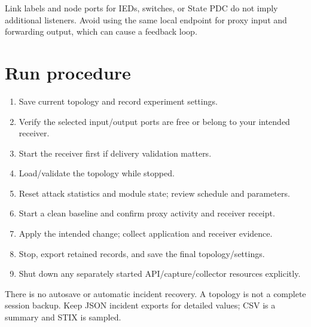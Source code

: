 Link labels and node ports for IEDs, switches, or State PDC do not imply additional listeners. Avoid using the same local endpoint for proxy input and forwarding output, which can cause a feedback loop.

\section*{Run procedure}
\begin{enumerate}
\item Save current topology and record experiment settings.
\item Verify the selected input/output ports are free or belong to your intended receiver.
\item Start the receiver first if delivery validation matters.
\item Load/validate the topology while stopped.
\item Reset attack statistics and module state; review schedule and parameters.
\item Start a clean baseline and confirm proxy activity and receiver receipt.
\item Apply the intended change; collect application and receiver evidence.
\item Stop, export retained records, and save the final topology/settings.
\item Shut down any separately started API/capture/collector resources explicitly.
\end{enumerate}

There is no autosave or automatic incident recovery. A topology is not a complete session backup. Keep JSON incident exports for detailed values; CSV is a summary and STIX is sampled.

